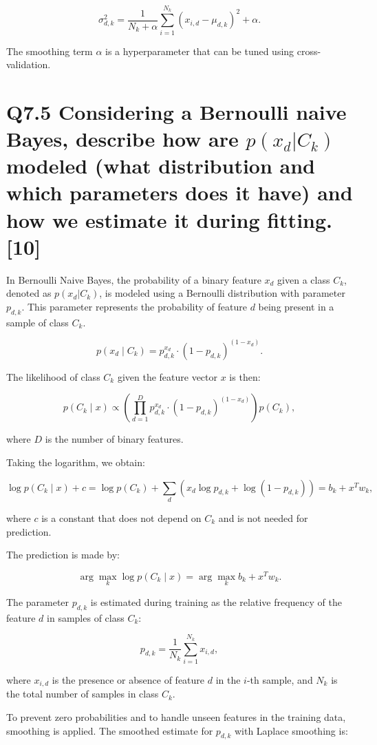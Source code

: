 \documentclass[11pt]{article}
\begin{document}
\[
\sigma_{d,k}^2 = \frac{1}{N_k + \alpha} \sum_{i=1}^{N_k} (x_{i,d} - \mu_{d,k})^2 + \alpha.
\]

The smoothing term \( \alpha \) is a hyperparameter that can be tuned using cross-validation.

\section{Q7.5 Considering a Bernoulli naive Bayes, describe how are $p(x_d | C_k)$ modeled (what distribution and which parameters does it have) and how we estimate it during fitting. [10]}

In Bernoulli Naive Bayes, the probability of a binary feature \( x_d \) given a class \( C_k \), denoted as \( p(x_d | C_k) \), is modeled using a Bernoulli distribution with parameter \( p_{d,k} \). This parameter represents the probability of feature \( d \) being present in a sample of class \( C_k \).

\[
p(x_d \mid C_k) = p_{d,k}^{x_d} \cdot (1 - p_{d,k})^{(1-x_d)}.
\]

The likelihood of class \( C_k \) given the feature vector \( x \) is then:

\[
p(C_k \mid x) \propto \left( \prod_{d=1}^{D} p_{d,k}^{x_d} \cdot (1 - p_{d,k})^{(1-x_d)} \right) p(C_k),
\]

where \( D \) is the number of binary features.

Taking the logarithm, we obtain:

\[
\log p(C_k \mid x) + c = \log p(C_k) + \sum_{d} \left( x_d \log p_{d,k} + \log(1 - p_{d,k}) \right) = b_k + x^T w_k,
\]

where \( c \) is a constant that does not depend on \( C_k \) and is not needed for prediction.

The prediction is made by:

\[
\arg \max_k \log p(C_k \mid x) = \arg \max_k b_k + x^T w_k.
\]

The parameter \( p_{d,k} \) is estimated during training as the relative frequency of the feature \( d \) in samples of class \( C_k \):

\[
p_{d,k} = \frac{1}{N_k} \sum_{i=1}^{N_k} x_{i,d},
\]

where \( x_{i,d} \) is the presence or absence of feature \( d \) in the \( i \)-th sample, and \( N_k \) is the total number of samples in class \( C_k \).

To prevent zero probabilities and to handle unseen features in the training data, smoothing is applied. The smoothed estimate for \( p_{d,k} \) with Laplace smoothing is:
\end{document}
